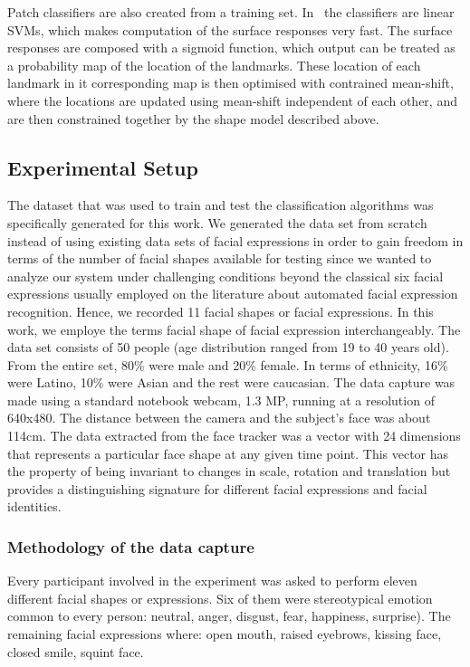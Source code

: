\documentclass[]{article}
\begin{document}
Patch classifiers are also created from a training
set. In~\cite{saragih2011deformable} the classifiers are linear SVMs,
which makes computation of the surface responses very fast. The
surface responses are composed with a sigmoid function, which output
can be treated as a probability map of the location of the
landmarks. These location of each landmark in it corresponding map is
then optimised with contrained mean-shift, where the locations are
updated using mean-shift independent of each other, and are then
constrained together by the shape model described above.



\subsection{Experimental Setup}
The dataset that was used to train and test the classification algorithms was specifically generated for this work. We
generated the data set from scratch instead of using existing data sets of facial expressions in order to gain freedom
in terms of the number of facial shapes available for testing since we wanted to analyze our system under challenging
conditions beyond the classical six facial expressions usually employed on the literature about automated facial
expression  recognition. Hence, we recorded 11 facial shapes or facial expressions. In this work, we employe the terms
facial shape of facial expression interchangeably. The data set consists of 50 people (age distribution ranged from 19
to 40 years old). From the entire set, 80\% were male and 20\% female. In terms of ethnicity, 16\% were Latino, 10\%
were Asian and the rest were caucasian. The data capture was made using a standard notebook webcam, 1.3 MP, running at a
resolution of 640x480. The distance between the camera and the subject's face was about 114cm. The data extracted from
the face tracker was a vector with 24 dimensions that represents a particular face shape at any given time point. This
vector has the property of being invariant to changes in scale, rotation and translation but provides a distinguishing
signature for different facial expressions and facial identities.


\subsubsection{Methodology of the data capture}
Every participant involved in the experiment was asked to perform eleven different facial shapes or expressions.
Six of them were stereotypical emotion common to every person: neutral, anger, disgust, fear, happiness,
surprise). The remaining facial expressions where: open mouth, raised eyebrows, kissing face, closed smile, squint face.
\end{document}
